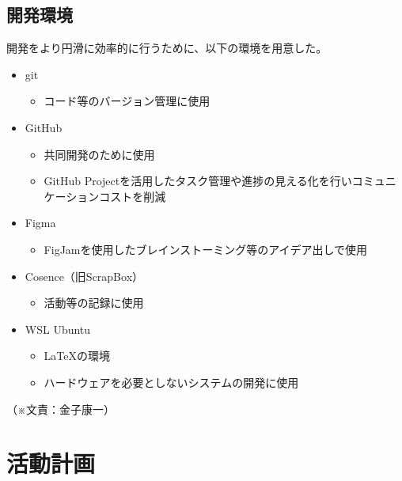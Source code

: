 \documentclass[11pt,a4paper]{report}
\newcommand{\Writer}[1]{
  \normalsize
  \begin{flushright}
    （※文責：#1）
  \end{flushright}
}
\begin{document}
\subsection{開発環境}
\noindent\space
開発をより円滑に効率的に行うために、以下の環境を用意した。
\begin{itemize}
  \item git
  \begin{itemize}
    \item コード等のバージョン管理に使用  
  \end{itemize}
  \item GitHub
  \begin{itemize}
    \item 共同開発のために使用
    \item GitHub Projectを活用したタスク管理や進捗の見える化を行いコミュニケーションコストを削減
  \end{itemize}
  \item Figma
  \begin{itemize}
    \item FigJamを使用したブレインストーミング等のアイデア出しで使用  
  \end{itemize}
  \item Cosence（旧ScrapBox）
  \begin{itemize}
    \item 活動等の記録に使用  
  \end{itemize}
  \item WSL Ubuntu
  \begin{itemize}
    \item LaTeXの環境
    \item ハードウェアを必要としないシステムの開発に使用  
  \end{itemize}
\end{itemize}
\Writer{金子康一}

\section{活動計画}\noindent
\end{document}
